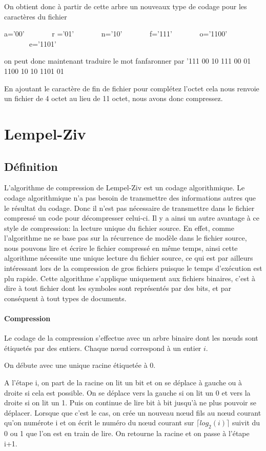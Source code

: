 \documentclass{report}
\begin{document}
On obtient donc à partir de cette arbre un nouveaux type de codage pour les caractères du fichier

a='00' \ \ \ \ \ \ \ r ='01' \ \ \ \ \ \ \ n='10' \ \ \ \ \ \ \ f='111' \ \ \ \ \ \ \ o='1100' \ \ \ \ \ \ \ e='1101'

on peut donc maintenant traduire le mot fanfaronner par '111 00 10 111 00 01 1100 10 10 1101 01

En ajoutant le caractère de fin de fichier pour complétez l'octet cela nous renvoie un fichier de 4 octet au lieu de 11 octet, nous avons donc compressez.

\chapter*{Lempel-Ziv}
\section*{Définition }

L'algorithme de compression de Lempel-Ziv est un codage algorithmique.  Le codage algorithmique n’a pas besoin de transmettre des informations autres que le résultat du codage. Donc il n'est pas nécessaire de transmettre dans le fichier compressé un code pour décompresser celui-ci. Il y a ainsi un autre avantage à ce style de compression: la lecture unique du fichier source. En effet, comme l'algorithme ne se base pas sur la récurrence de modèle dans le fichier source, nous pouvons lire et écrire le fichier compressé en même temps, ainsi cette algorithme nécessite une unique lecture du fichier source, ce qui est par ailleurs intéressant lors de la compression de gros fichiers puisque le temps d'exécution est plu rapide. 
Cette algorithme s'applique uniquement aux fichiers binaires, c'est à dire à tout fichier dont les symboles sont représentés par des bits, et par conséquent à tout types de documents. 

\subsubsection{Compression}
Le codage de la compression s'effectue avec un arbre binaire dont les nœuds sont étiquetés par des entiers. Chaque nœud correspond à un entier $i$. 

On débute avec une unique racine étiquetée à 0.

A l'étape i, on part de la racine on lit un bit et on se déplace à gauche ou à droite si cela est possible. On se déplace vers la gauche si on lit un 0 et vers la droite si on lit un 1. Puis on continue de lire bit à bit jusqu'à ne plus pouvoir se déplacer. Lorsque que c'est le cas, on crée un nouveau nœud fils au nœud courant qu'on numérote i et on écrit le numéro du nœud courant sur $\lceil log_{2}(i) \rceil$ suivit du 0 ou 1 que l'on est en train de lire.
On retourne la racine et on passe à l'étape i+1.
\end{document}
